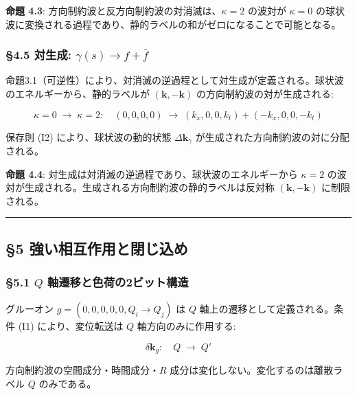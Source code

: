 \documentclass[
  a4paper,11pt]{ltjsarticle}
\theoremstyle{definition}
\theoremstyle{remark}
\begin{document}
\textbf{命題 4.3}: 方向制約波と反方向制約波の対消滅は、\(\kappa = 2\)
の波対が \(\kappa = 0\)
の球状波に変換される過程であり、静的ラベルの和がゼロになることで可能となる。

\subsubsection{\texorpdfstring{§4.5 対生成:
\(\gamma(s) \to f + \bar{f}\)}{§4.5 対生成: \textbackslash gamma(s) \textbackslash to f + \textbackslash bar\{f\}}}\label{ux5bfeux751fux6210-gammas-to-f-barf}

命題3.1（可逆性）により、対消滅の逆過程として対生成が定義される。球状波のエネルギーから、静的ラベルが
\((\mathbf{k}, -\mathbf{k})\) の方向制約波の対が生成される:

\[\kappa = 0 \;\longrightarrow\; \kappa = 2:\quad (0, 0, 0, 0) \;\longrightarrow\; (k_x, 0, 0, k_t) + (-k_x, 0, 0, -k_t)\]

保存則 (I2) により、球状波の動的状態 \(\Delta\mathbf{k}_\gamma\)
が生成された方向制約波の対に分配される。

\textbf{命題 4.4}: 対生成は対消滅の逆過程であり、球状波のエネルギーから
\(\kappa = 2\)
の波対が生成される。生成される方向制約波の静的ラベルは反対称
\((\mathbf{k}, -\mathbf{k})\) に制限される。

\begin{center}\rule{0.5\linewidth}{0.5pt}\end{center}

\subsection{§5
強い相互作用と閉じ込め}\label{ux5f37ux3044ux76f8ux4e92ux4f5cux7528ux3068ux9589ux3058ux8fbcux3081}

\subsubsection{\texorpdfstring{§5.1 \(Q\)
軸遷移と色荷の2ビット構造}{§5.1 Q 軸遷移と色荷の2ビット構造}}\label{q-ux8ef8ux9077ux79fbux3068ux8272ux8377ux306e2ux30d3ux30c3ux30c8ux69cbux9020}

グルーオン \(g = (0, 0, 0, 0, 0, Q_i \to Q_j)\) は \(Q\)
軸上の遷移として定義される。条件 (I1) により、変位転送は \(Q\)
軸方向のみに作用する:

\[\delta\mathbf{k}_g: \quad Q \;\longrightarrow\; Q'\]

方向制約波の空間成分・時間成分・\(R\)
成分は変化しない。変化するのは離散ラベル \(Q\) のみである。
\end{document}
